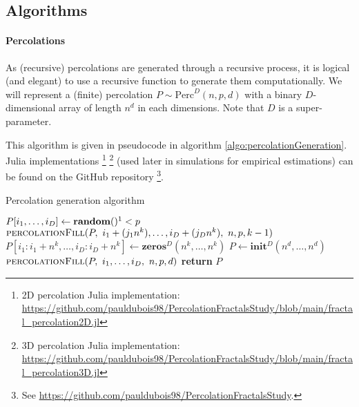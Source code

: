\subsection{Algorithms}\label{algorithms}
\paragraph{Percolations}
As (recursive) percolations are generated through a recursive process, it is logical (and elegant) to use a recursive function to generate them computationally.
We will represent a (finite) percolation $P \sim \text{Perc}^D(n,p,d)$ with a binary $D$-dimensional array of length $n^d$ in each dimensions.
Note that $D$ is a super-parameter.

This algorithm is given in pseudocode in algorithm \ref{algo:percolationGeneration}. Julia implementations
\footnote{2D percolation Julia implementation: \url{https://github.com/pauldubois98/PercolationFractalsStudy/blob/main/fractal\_percolation2D.jl}}
\footnote{3D percolation Julia implementation: \url{https://github.com/pauldubois98/PercolationFractalsStudy/blob/main/fractal\_percolation3D.jl}}
(used later in simulations for empirical estimations) can be found on the GitHub repository
\footnote{See \url{https://github.com/pauldubois98/PercolationFractalsStudy}.}.

\begin{algorithm}[!h]
	\caption{Percolation generation algorithm}\label{algo:percolationGeneration}
	\begin{algorithmic}[1]
		\State $P[i_1,\dots,i_D] \gets \textbf{random}()\footnotemark < p$ 
		\Else
		\State $\textsc{percolationFill}(P, \ i_1+(j_1 n^k),\dots,i_D+(j_D n^k), \ n, p, k-1)$ 
		\Else
		\State $P[i_1:i_1+n^k,\dots,i_D:i_D+n^k] \gets \textbf{zeros$^D$}(n^k,\dots,n^k)$ 
		\EndIf
		\EndFor
		\EndIf
		\EndProcedure
		\State $P \gets \textbf{init$^D$}(n^d,\dots,n^d)$
		\State $\textsc{percolationFill}(P, \ i_1,\dots,i_D, \ n, p, d)$ 
		\State \textbf{return} $P$
		\EndProcedure
	\end{algorithmic}
\end{algorithm}
\addtocounter{footnote}{-1}
\addtocounter{footnote}{-1}

